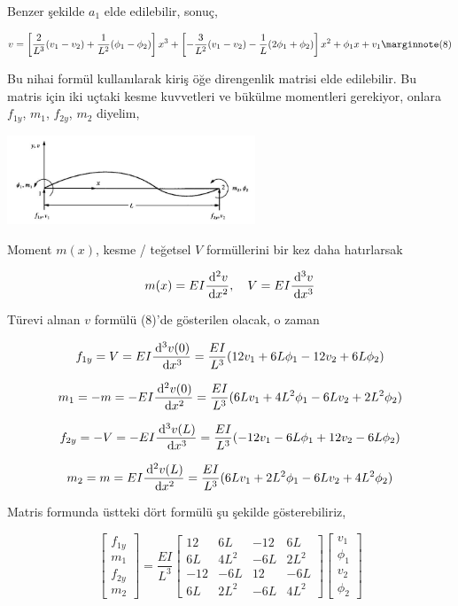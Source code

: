 \documentclass[12pt,fleqn]{article}\usepackage{../../common}
\begin{document}
Benzer şekilde $a_1$ elde edilebilir, sonuç,

$$
v =
\left[
  \frac{2}{L^3} (v_1 - v_2) + \frac{1}{L^2} (\phi_1 - \phi_2) 
\right] x^3 +
\left[
  -\frac{3}{L^2} (v_1 - v_2) - \frac{1}{L} (2\phi_1 + \phi_2)
\right] x^2 +
\phi_1 x + v_1
\mlabel{8}
$$

Bu nihai formül kullanılarak kiriş öğe direngenlik matrisi elde
edilebilir. Bu matris için iki uçtaki kesme kuvvetleri ve
bükülme momentleri gerekiyor, onlara $f_{1y}$, $m_1$, $f_{2y}$,
$m_2$ diyelim,

\includegraphics[width=20em]{phy_020_strs_05_10.jpg}

Moment $m(x)$, kesme / teğetsel $V$ formüllerini bir kez daha hatırlarsak

$$
m(x) = EI \frac{\,\mathrm{d}^2 v}{\,\mathrm{d} x^2}, \quad
V = EI \frac{\,\mathrm{d}^3 v}{\,\mathrm{d} x^3}
$$

Türevi alınan $v$ formülü (8)'de gösterilen olacak, o zaman

$$
f_{1y} = V = EI \frac{\,\mathrm{d}^3 v(0)}{\,\mathrm{d} x^3} =
\frac{EI}{L^3} (12 v_1 + 6L \phi_1 - 12 v_2 + 6L \phi_2 )
$$

$$
m_1 = -m = -EI \frac{\,\mathrm{d}^2 v(0)}{\,\mathrm{d} x^2} =
\frac{EI}{L^3} ( 6L v_1 + 4L^2 \phi_1 - 6L v_2 + 2 L^2 \phi_2 )
$$

$$
f_{2y} = -V = -EI \frac{\,\mathrm{d}^3 v(L)}{\,\mathrm{d} x^3} =
\frac{EI}{L^3} (-12 v_1 - 6L \phi_1 + 12 v_2 - 6L \phi_2 )
$$

$$
m_2 = m = EI \frac{\,\mathrm{d}^2 v(L)}{\,\mathrm{d} x^2} =
\frac{EI}{L^3} ( 6L v_1 + 2L^2 \phi_1 - 6L v_2 + 4 L^2 \phi_2)
$$

Matris formunda üstteki dört formülü şu şekilde gösterebiliriz,

$$
\left[\begin{array}{c}
f_{1y} \\ m_1 \\ f_{2y} \\ m_2
\end{array}\right] =
\frac{EI}{L^3}
\left[\begin{array}{cccc}
12 & 6L & -12 & 6L \\
6L & 4L^2 & -6L & 2L^2 \\
-12 & -6L & 12 & -6L \\
6L & 2L^2 & -6L & 4L^2
\end{array}\right]
\left[\begin{array}{ccc}
v_1 \\ \phi_1 \\ v_2 \\ \phi_2
\end{array}\right]
$$
\end{document}

